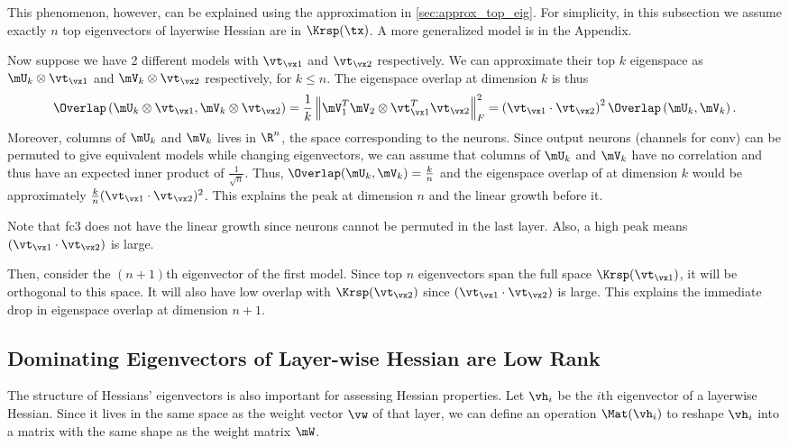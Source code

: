 This phenomenon, however, can be explained using the approximation in \cref{sec:approx_top_eig}. For simplicity, in this subsection we assume exactly $n$ top eigenvectors of layerwise Hessian are in $\Krsp(\tx)$. A more generalized model is in the Appendix.

Now suppose we have 2 different models with $\vt_{\vx1}$ and $\vt_{\vx2}$ respectively. We can approximate their top $k$ eigenspace as $\mU_k \otimes \vt_{\vx1}$ and $\mV_k \otimes \vt_{\vx2}$ respectively, for $k \leq n$. The eigenspace overlap at dimension $k$ is thus
\begin{equation}
\Overlap\left(\mU_k \otimes \vt_{\vx1}, \mV_k \otimes \vt_{\vx2}\right) =\frac{1}{k}\left\|\mV_1^T\mV_2 \otimes \vt_{\vx1}^T\vt_{\vx2}\right\|^2_F= \left(\vt_{\vx1} \cdot \vt_{\vx2}\right)^2\Overlap\left(\mU_k, \mV_k\right).
\label{eqn:model_overlap}
\end{equation}
Moreover, columns of $\mU_k$ and $\mV_k$ lives in $\R^n$, the space corresponding to the neurons. Since output neurons (channels for conv) can be permuted to give equivalent models while changing eigenvectors, we can assume that columns of $\mU_k$ and $\mV_k$ have no correlation and thus have an expected inner product of $\frac{1}{\sqrt{n}}$. Thus, $\Overlap(\mU_k, \mV_k) = \frac{k}{n}$ and the eigenspace overlap of at dimension $k$ would be approximately $\frac{k}{n}(\vt_{\vx1} \cdot \vt_{\vx2})^2$. This explains the peak at dimension $n$ and the linear growth before it. 

Note that fc3 does not have the linear growth since neurons cannot be permuted in the last layer. Also, a high peak means $(\vt_{\vx1} \cdot \vt_{\vx2})$ is large. 

Then, consider the $(n+1)$th eigenvector of the first model. Since top $n$ eigenvectors span the full space $\Krsp(\vt_{\vx1})$, it will be orthogonal to this space. It will also have low overlap with $\Krsp(\vt_{\vx2})$ since $(\vt_{\vx1} \cdot \vt_{\vx2})$ is large. This explains the immediate drop in eigenspace overlap at dimension $n+1$. 

\subsection{Dominating Eigenvectors of Layer-wise Hessian are Low Rank}
The structure of Hessians' eigenvectors is also important for assessing Hessian properties. Let $\vh_i$ be the $i$th eigenvector of a layerwise Hessian. Since it lives in the same space as the weight vector $\vw$ of that layer, we can define an operation $\Mat(\vh_i)$ to reshape $\vh_i$ into a matrix with the same shape as the weight matrix $\mW$. 

